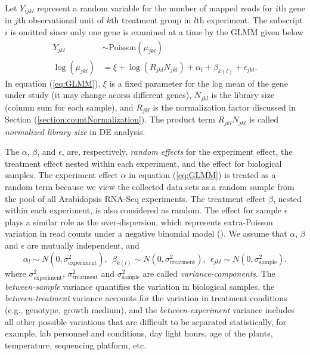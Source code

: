 \documentclass[11pt, a4paper]{article}
\begin{document}
Let $Y_{ijkl}$ represent a random variable for the number of mapped reads for $i$th gene
in $j$th observational unit of $k$th treatment group in $l$th experiment.
The subscript $i$ is omitted since only one gene is examined at a time
by the GLMM \citep{mcculloch2001generalized} given below
\begin{equation}\label{eq:GLMM}
	\begin{aligned}
	  Y_{jkl} & \sim \text{Poisson}(\mu_{jkl}) \\
	  \log( \mu_{jkl}) &= \xi + \log(R_{jkl}N_{jkl})+ \alpha_l + \beta_{k(l)} + \epsilon_{jkl}.
	\end{aligned}
\end{equation}
In equation (\ref{eq:GLMM}), $\xi$ is a fixed parameter for the log mean of the gene under study (it may change acorss different genes), 
$N_{jkl}$ is the library size (column sum for each sample), and $R_{jkl}$ is the normalization factor discussed in Section (\ref{section:countNormalization}). The product term $R_{jkl}N_{jkl}$ is called \textit{normalized library size} in DE analysis. 

The $\alpha$, $\beta$, and $\epsilon$, are, respectively, \textit{random effects} for the experiment effect, the treatment effect nested within each experiment, and the effect for biological samples. The experiment effect $\alpha$ in equation (\ref{eq:GLMM}) is treated as a random term  because we view the collected data sets as a random sample from the pool of all Arabidopsis RNA-Seq experiments. The treatment effect $\beta$, nested within each experiment, is also considered as random. The effect for sample $\epsilon$ plays a similar role as the over-dispersion, which represents extra-Poisson variation in read counts under a negative binomial model (\citealt{anders2010differential,di2011nbp}). We assume that $\alpha$, $\beta$ and $\epsilon$ are mutually independent, and  
  \[\alpha_l\sim N(0, \sigma^2_{\text{experiment}}),~~
  \beta_{k(l)}\sim N(0, \sigma^2_{\text{treatment}}),~~
  \epsilon_{jkl}\sim N(0, \sigma_{\text{sample}}^2).\]
where $\sigma_{\text{experiment}}^2$, $\sigma_{\text{treatment}}^2$ and $\sigma_{\text{sample}}^2$ are called \textit{variance-components}.
The \textit{between-sample} variance quantifies the variation in biological samples, the \textit{between-treatment} variance accounts for the variation in treatment conditions (e.g., genotype, growth medium), and the \textit{between-experiment} variance includes all other possible variations that are difficult to be separated statistically, for example, lab personnel and conditions, day light hours, age of the plants, temperature, sequencing platform, etc.
\end{document}
